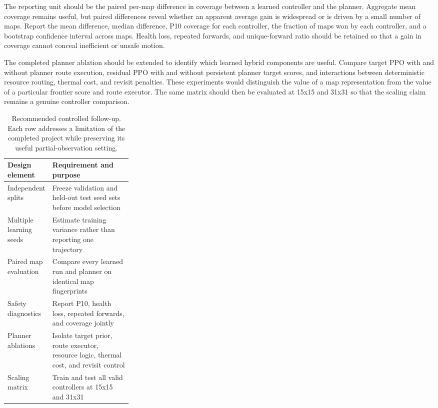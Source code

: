 \documentclass[10pt,letterpaper]{article}
\begin{document}
The reporting unit should be the paired per-map difference in coverage between
a learned controller and the planner. Aggregate mean coverage remains useful,
but paired differences reveal whether an apparent average gain is widespread
or is driven by a small number of maps. Report the mean difference, median
difference, P10 coverage for each controller, the fraction of maps won by each
controller, and a bootstrap confidence interval across maps. Health loss,
repeated forwards, and unique-forward ratio should be retained so that a gain
in coverage cannot conceal inefficient or unsafe motion.

The completed planner ablation should be extended to identify which learned
hybrid components are useful. Compare target PPO with and without planner
route execution, residual PPO with and without persistent planner target
scores, and interactions between deterministic resource routing, thermal cost,
and revisit penalties. These experiments would distinguish the value of a map
representation from the value of a particular frontier score and route
executor. The same matrix should then be evaluated at 15x15 and 31x31 so that
the scaling claim remains a genuine controller comparison.

\begin{table}[H]
\caption{Recommended controlled follow-up. Each row addresses a limitation of the completed project while preserving its useful partial-observation setting.}
\label{tab:followup}
\centering
\small
\begin{tabularx}{\linewidth}{p{0.29\linewidth}Y}
\toprule
Design element & Requirement and purpose \\
\midrule
Independent splits & Freeze validation and held-out test seed sets before model selection \\
Multiple learning seeds & Estimate training variance rather than reporting one trajectory \\
Paired map evaluation & Compare every learned run and planner on identical map fingerprints \\
Safety diagnostics & Report P10, health loss, repeated forwards, and coverage jointly \\
Planner ablations & Isolate target prior, route executor, resource logic, thermal cost, and revisit control \\
Scaling matrix & Train and test all valid controllers at 15x15 and 31x31 \\
\bottomrule
\end{tabularx}
\end{table}
\end{document}
